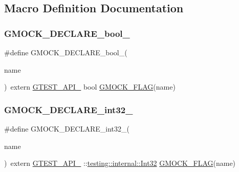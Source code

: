 \subsection{Macro Definition Documentation}
\mbox{\label{gmock-port_8h_a7a0a953221ea8ef5aaa6c644a48af599}} 
\subsubsection{\texorpdfstring{GMOCK\_DECLARE\_bool\_}{GMOCK\_DECLARE\_bool\_}}
{\footnotesize\ttfamily \#define G\+M\+O\+C\+K\+\_\+\+D\+E\+C\+L\+A\+R\+E\+\_\+bool\+\_\+(\begin{DoxyParamCaption}\item[{}]{name }\end{DoxyParamCaption})~extern \mbox{\hyperlink{gtest-port_8h_aa73be6f0ba4a7456180a94904ce17790}{G\+T\+E\+S\+T\+\_\+\+A\+P\+I\+\_\+}} bool \mbox{\hyperlink{gmock-port_8h_ad7119adfef06be5e7b1551633f5a1436}{G\+M\+O\+C\+K\+\_\+\+F\+L\+AG}}(name)}

\mbox{\label{gmock-port_8h_adeb7f0a8d842d1d541615763835af3f9}} 
\subsubsection{\texorpdfstring{GMOCK\_DECLARE\_int32\_}{GMOCK\_DECLARE\_int32\_}}
{\footnotesize\ttfamily \#define G\+M\+O\+C\+K\+\_\+\+D\+E\+C\+L\+A\+R\+E\+\_\+int32\+\_\+(\begin{DoxyParamCaption}\item[{}]{name }\end{DoxyParamCaption})~extern \mbox{\hyperlink{gtest-port_8h_aa73be6f0ba4a7456180a94904ce17790}{G\+T\+E\+S\+T\+\_\+\+A\+P\+I\+\_\+}} \+::\mbox{\hyperlink{namespacetesting_1_1internal_a8ee38faaf875f133358abaf9bc056cec}{testing\+::internal\+::\+Int32}} \mbox{\hyperlink{gmock-port_8h_ad7119adfef06be5e7b1551633f5a1436}{G\+M\+O\+C\+K\+\_\+\+F\+L\+AG}}(name)}

\mbox{\label{gmock-port_8h_a35af08c45131cf68d78446cb8cfe40fe}} 
